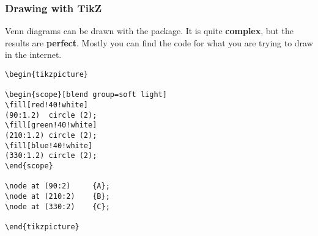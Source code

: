 \begin{frame}[fragile]
\frametitle{Drawing with TikZ}

Venn diagrams can be drawn with the  package. It is quite \textbf{complex}, but the results are \textbf{perfect}. Mostly you can find the code for what you are trying to draw in the internet.

\begin{minipage}{.48\textwidth}
{\scriptsize
\begin{lstlisting}	
\begin{tikzpicture}

\begin{scope}[blend group=soft light]
\fill[red!40!white]
(90:1.2)  circle (2);
\fill[green!40!white]
(210:1.2) circle (2);
\fill[blue!40!white]
(330:1.2) circle (2);
\end{scope}

\node at (90:2)     {A};
\node at (210:2)    {B};
\node at (330:2)    {C};		

\end{tikzpicture}
\end{lstlisting}	
}

\end{minipage}
\begin{minipage}{.48\textwidth}

\end{minipage}	

\end{frame}



